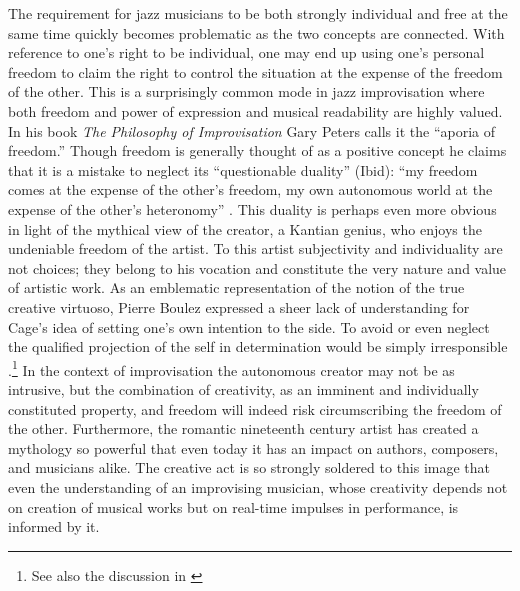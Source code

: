 \documentclass[a4paper]{article}
\begin{document}
The requirement for jazz musicians to be both strongly individual and free at the same time quickly becomes problematic as the two concepts are connected. With reference to one’s right to be individual, one may end up using one’s personal freedom to claim the right to control the situation at the expense of the freedom of the other. This is a surprisingly common mode in jazz improvisation where both freedom and power of expression and musical readability are highly valued. In his book \emph{The Philosophy of Improvisation} Gary Peters calls it the ``aporia of freedom.''\autocite[21]{peters09} Though freedom is generally thought of as a positive concept he claims that it is a mistake to neglect its ``questionable duality'' (Ibid): ``my freedom comes at the expense of the other’s freedom, my own autonomous world at the expense of the other’s heteronomy'' \autocite[p. 165]{benson03}. This duality is perhaps even more obvious in light of the mythical view of the creator, a Kantian genius, who enjoys the undeniable freedom of the artist. To this artist subjectivity and individuality are not choices; they belong to his vocation and constitute the very nature and value of artistic work. As an emblematic representation of the notion of the true creative virtuoso, Pierre Boulez expressed a sheer lack of understanding for Cage’s idea of setting one’s own intention to the side. To avoid or even neglect the qualified projection of the self in determination would be simply irresponsible \autocite{boulez64}.\footnote{See also the discussion in \autocite[144-5]{frisk2013}} In the context of improvisation the autonomous creator may not be as intrusive, but the combination of creativity, as an imminent and individually constituted property, and freedom will indeed risk circumscribing the freedom of the other. Furthermore, the romantic nineteenth century artist has created a mythology so powerful that even today it has an impact on authors, composers, and musicians alike. The creative act is so strongly soldered to this image that even the understanding of an improvising musician, whose creativity depends not on creation of musical works but on real-time impulses in performance, is informed by it.



\end{document}
